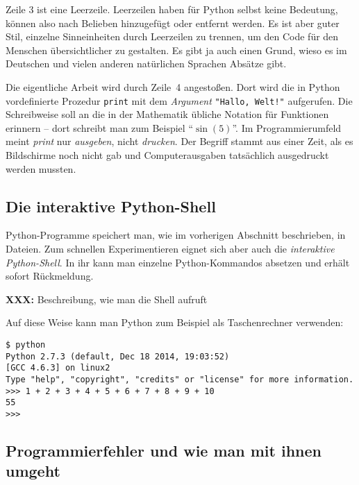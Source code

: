 \documentclass{blatt}
\newcommand{\XXX}[1]{\textbf{XXX:} #1}
\begin{document}
Zeile 3 ist eine Leerzeile. Leerzeilen haben für Python selbst keine Bedeutung,
können also nach Belieben hinzugefügt oder entfernt werden. Es ist aber guter
Stil, einzelne Sinneinheiten durch Leerzeilen zu trennen, um den Code für den
Menschen übersichtlicher zu gestalten. Es gibt ja auch einen Grund, wieso es im
Deutschen und vielen anderen natürlichen Sprachen Absätze gibt.

Die eigentliche Arbeit wird durch Zeile~4 angestoßen. Dort wird die in Python
vordefinierte Prozedur \texttt{print} mit dem \emph{Argument}
\texttt{"Hallo, Welt!"} aufgerufen. Die Schreibweise soll an die in der Mathematik übliche
Notation für Funktionen erinnern -- dort schreibt man zum Beispiel
"`$\sin(5)$"'. Im Programmierumfeld meint \emph{print} nur \emph{ausgeben},
nicht \emph{drucken}. Der Begriff stammt aus einer Zeit, als es Bildschirme
noch nicht gab und Computerausgaben tatsächlich ausgedruckt werden mussten.


\subsection{Die interaktive Python-Shell}

Python-Programme speichert man, wie im vorherigen Abschnitt beschrieben, in
Dateien. Zum schnellen Experimentieren eignet sich aber auch die
\emph{interaktive Python-Shell}. In ihr kann man einzelne Python-Kommandos
absetzen und erhält sofort Rückmeldung.

\XXX{Beschreibung, wie man die Shell aufruft}

Auf diese Weise kann man Python zum Beispiel als Taschenrechner verwenden:
\begin{verbatim}
$ python
Python 2.7.3 (default, Dec 18 2014, 19:03:52)
[GCC 4.6.3] on linux2
Type "help", "copyright", "credits" or "license" for more information.
>>> 1 + 2 + 3 + 4 + 5 + 6 + 7 + 8 + 9 + 10
55
>>>
\end{verbatim}


\subsection{Programmierfehler und wie man mit ihnen umgeht}
\end{document}

